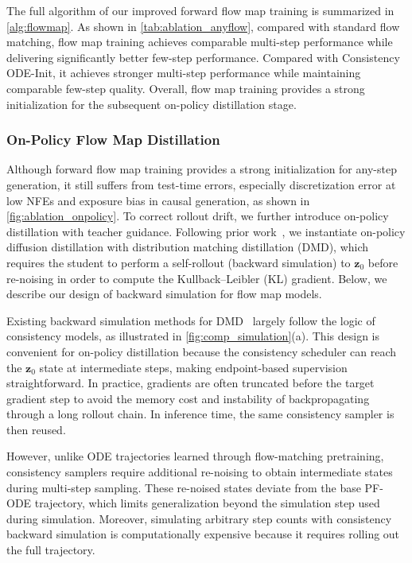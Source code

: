  The full algorithm of our improved forward flow map training is summarized in \cref{alg:flowmap}. As shown in \cref{tab:ablation_anyflow}, compared with standard flow matching, flow map training achieves comparable multi-step performance while delivering significantly better few-step performance. Compared with Consistency ODE-Init, it achieves stronger multi-step performance while maintaining comparable few-step quality. Overall, flow map training provides a strong initialization for the subsequent on-policy distillation stage.





\subsubsection{On-Policy Flow Map Distillation}
\label{sec:on_policy}

\noindent Although forward flow map training provides a strong initialization for any-step generation, it still suffers from test-time errors, especially discretization error at low NFEs and exposure bias in causal generation, as shown in \cref{fig:ablation_onpolicy}. To correct rollout drift, we further introduce on-policy distillation with teacher guidance. Following prior work~\cite{huang2025selfforcing, zheng2025large}, we instantiate on-policy diffusion distillation with distribution matching distillation (DMD), which requires the student to perform a self-rollout (\ie backward simulation) to $\mathbf{z}_0$ before re-noising in order to compute the Kullback--Leibler (KL) gradient. Below, we describe our design of backward simulation for flow map
models.

Existing backward simulation methods for DMD~\cite{huang2025selfforcing, zheng2025large} largely follow the logic of consistency models, as illustrated in \cref{fig:comp_simulation}(a). This design is convenient for on-policy distillation because the consistency scheduler can reach the $\mathbf{z}_0$ state at intermediate steps, making endpoint-based supervision straightforward. In practice, gradients are often truncated before the target gradient step to avoid the memory cost and instability of backpropagating through a long rollout chain. In inference time, the same consistency sampler is then reused.

However, unlike ODE trajectories learned through flow-matching pretraining, consistency samplers require additional re-noising to obtain intermediate states during multi-step sampling. These re-noised states deviate from the base PF-ODE trajectory, which limits generalization beyond the simulation step used during simulation. Moreover, simulating arbitrary step counts with consistency backward simulation is computationally expensive because it requires rolling out the full trajectory.

